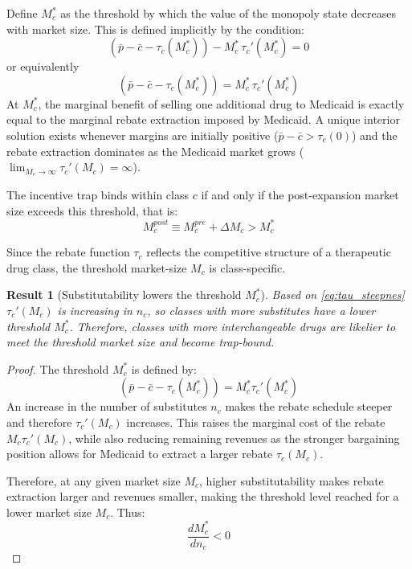 \documentclass[12pt]{article}
\newtheorem{result}{Result}
\begin{document}
Define $M_c^*$ as the threshold by which the value of the monopoly state decreases with market size. This is defined implicitly by the condition:
\begin{equation} \label{eq:dVM_threshold}
    (\bar{p} - \bar{c} - \tau_c(M_c^*)) - M_c^* \, \tau_c'(M_c^*) = 0
\end{equation}
or equivalently
\begin{equation} \label{eq:threshold}
    (\bar{p} - \bar{c} - \tau_c(M_c^*)) = M_c^* \, \tau_c'(M_c^*)
\end{equation}
At $M_c^*$, the marginal benefit of selling one additional drug to Medicaid is exactly equal to the marginal rebate extraction imposed by Medicaid. A unique interior solution exists whenever margins are initially positive ($\bar{p} - \bar{c} > \tau_c(0)$) and the rebate extraction dominates as the Medicaid market grows ($\lim_{M_c \to \infty} \tau_c'(M_c) = \infty$).

The incentive trap binds within class $c$ if and only if the post-expansion market size exceeds this threshold, that is:
\begin{equation} \label{eq:trap_condition}
    M_c^{post} \equiv M_c^{pre} + \Delta M_c > M_c^*
\end{equation}

Since the rebate function $\tau_c$ reflects the competitive structure of a therapeutic drug class, the threshold market-size $M_c$ is class-specific.

\begin{result}[Substitutability lowers the threshold $M^*_c$] \label{res:subs}
Based on \ref{eq:tau_steepnes} $\tau_c'(M_c)$ is increasing in $n_c$, so classes with more substitutes have a lower threshold $M_c^*$. Therefore, classes with more interchangeable drugs are likelier to meet the threshold market size and become trap-bound.
\end{result}

\begin{proof}
The threshold $M_c^*$ is defined by:
\[
(\bar{p} - \bar{c} - \tau_c(M_c^*)) = M_c^* \tau_c'(M_c^*)
\]
An increase in the number of substitutes $n_c$ makes the rebate schedule steeper and therefore $\tau_c'(M_c)$ increases. This raises the marginal cost of the rebate $M_c \tau_c'(M_c)$, while also reducing remaining revenues as the stronger bargaining position allows for Medicaid to extract a larger rebate $\tau_c(M_c)$.

Therefore, at any given market size $M_c$, higher substitutability makes rebate extraction larger and revenues smaller, making the threshold level reached for a lower market size $M_c$. Thus:
\[
\frac{dM_c^*}{dn_c} < 0
\]
\end{proof}
\end{document}
